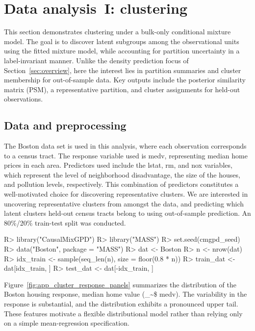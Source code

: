 \documentclass[preprint,12pt,authoryear]{elsarticle}
\makeatletter
\newcommand\code{\bgroup\@makeother\_\@makeother\~\@makeother\$\@codex}
\def\@codex#1{{\normalfont\ttfamily\hyphenchar\font=-1 #1}\egroup}
\renewenvironment{Schunk}{\vspace{0pt}}{\vspace{-0.1\baselineskip}}
\makeatother
\begin{document}
\section{Data analysis~I: clustering}
\label{sec:app-clustering}

This section demonstrates clustering under a bulk-only conditional mixture model. The goal is to discover latent subgroups among the observational units using the fitted mixture model, while accounting for partition uncertainty in a label-invariant manner. Unlike the density prediction focus of Section~\ref{sec:overview}, here the interest lies in partition summaries and cluster membership for out-of-sample data. Key outputs include the posterior similarity matrix (PSM), a representative partition, and cluster assignments for held-out observations.

\subsection{Data and preprocessing}

The Boston data set is used in this analysis, where each observation corresponds to a census tract. The response variable used is medv, representing median home prices in each area. Predictors used include the lstat, rm, and nox variables, which represent the level of neighborhood disadvantage, the size of the houses, and pollution levels, respectively. This combination of predictors constitutes a well-motivated choice for discovering representative clusters. We are interested in uncovering representative clusters from amongst the data, and predicting which latent clusters held-out census tracts belong to using out-of-sample prediction. An 80\%/20\% train-test split was conducted.

\begin{Schunk}
\begin{Sinput}
R> library("CausalMixGPD")
R> library("MASS")
R> set.seed(cmgpd_seed)
R> data("Boston", package = "MASS")
R> dat <- Boston
R> n <- nrow(dat)
R> idx_train <- sample(seq_len(n), size = floor(0.8 * n))
R> train_dat <- dat[idx_train, ]
R> test_dat <- dat[-idx_train, ]
\end{Sinput}
\end{Schunk}
Figure~\ref{fig:app_cluster_response_panels} summarizes the distribution of the Boston housing response, median home value (\code{medv}). The variability in the response is substantial, and the distribution exhibits a pronounced upper tail. These features motivate a flexible distributional model rather than relying only on a simple mean-regression specification.
\end{document}
